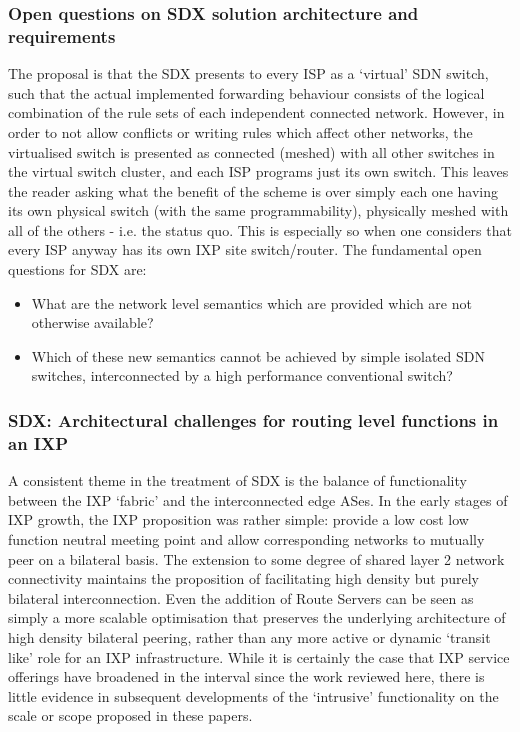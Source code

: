 
\subsubsection{Open questions on SDX solution architecture and requirements}
The proposal is that the SDX presents to every ISP as a `virtual' SDN switch, such that the actual implemented forwarding behaviour consists of the logical combination of the rule sets of each independent connected network.
However, in order to not allow conflicts or writing rules which affect other networks, the virtualised switch is presented as connected (meshed) with all other switches in the virtual switch cluster, and each ISP programs just its own switch.
This leaves the reader asking what the benefit of the scheme is over simply each one having its own physical switch (with the same programmability), physically meshed with all of the others - i.e. the status quo.
This is especially so when one considers that every ISP anyway has its own IXP site switch/router.
The fundamental open questions for SDX are:

\begin{itemize}[noitemsep,nolistsep]
	\item{What are the network level semantics which are provided which are not otherwise available?}
	\item{Which of these new semantics cannot be achieved by simple isolated SDN switches, interconnected by a high performance conventional switch?}
\end{itemize}

\subsubsection{SDX: Architectural challenges for routing level functions in an IXP}
A consistent theme in the treatment of SDX is the balance of functionality between the IXP `fabric' and the interconnected edge ASes.  In the early stages of IXP growth, the IXP proposition was rather simple: provide a low cost low function neutral meeting point and allow corresponding networks to mutually peer on a bilateral basis.  The extension to some degree of shared layer 2 network connectivity maintains the proposition of facilitating high density but purely bilateral interconnection.  Even the addition of Route Servers can be seen as simply a more scalable optimisation that preserves the underlying architecture of high density bilateral peering, rather than any more active or dynamic `transit like' role for an IXP infrastructure.
While it is certainly the case that IXP service offerings have broadened in the interval since the work reviewed here, there is little evidence in subsequent developments of the `intrusive' functionality on the scale or scope proposed in these papers.

